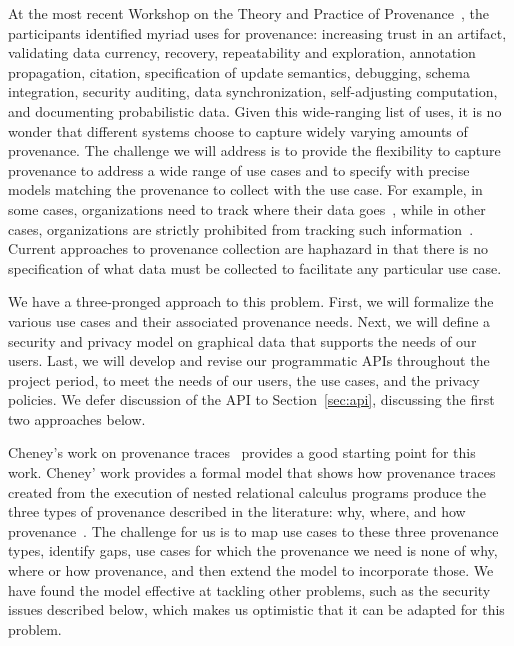 \documentclass[10pt]{article}
\begin{document}
At the most recent Workshop on the Theory and Practice of
Provenance~\cite{tapp11}, the participants identified myriad uses
for provenance: increasing trust in an artifact, validating data
currency, recovery, repeatability and exploration, annotation
propagation, citation, specification of update semantics, debugging,
schema integration, security auditing, data synchronization, self-adjusting
computation, and documenting probabilistic data.
Given this wide-ranging list of uses, it is no wonder that different
systems choose to capture widely varying amounts of provenance.
The challenge we will address is to provide the flexibility to capture
provenance to address a wide range of use cases and to specify with
precise models matching the provenance to collect with the use case.
For example, in some cases, organizations need to track where their
data goes~\cite{tapp-ucsc}, while in other cases, organizations
are strictly prohibited from tracking such information~\cite{ebi,isb,ncbi}.
Current approaches to provenance collection are haphazard in that
there is no specification of what data must be collected to facilitate
any particular use case.


We have a three-pronged approach to this problem.
First, we will formalize the various use cases and their associated
provenance needs.
Next, we will define a security and privacy model on graphical data that
supports the needs of our users.
Last, we will develop and revise our programmatic APIs throughout the
project period, to meet the needs of our users, the use cases, and
the privacy policies.
We defer discussion of the API to Section~\ref{sec:api},
discussing the first two approaches below.

Cheney's work on provenance traces~\cite{prov-traces-draft}
provides a good starting point for this work.
Cheney' work provides a formal model that shows how provenance traces created
from the execution of nested relational calculus programs produce
the three types of provenance described in the literature: why, where, and
how provenance~\cite{cheney-wwh}.
The challenge for us is to map use cases to these three provenance types,
identify gaps, use cases for which the provenance we need is none of
why, where or how provenance, and then extend the model to incorporate
those.
We have found the model effective at tackling other problems, such as
the security issues described below, which makes us optimistic that
it can be adapted for this problem.
\end{document}
